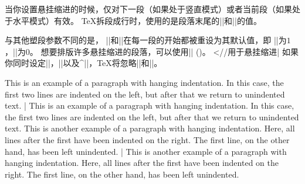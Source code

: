 当你设置悬挂缩进的时候，仅对下一段（如果处于竖直模式）或者当前段（如果处于水平模式）有效。
\TeX{}拆段成行时，使用的是段落末尾的|\hangafter|和|\hangindent|的值。
%


与其他塑段参数不同的是，
|\hangafter|和|\hangindent|在每一段的开始都被重设为其默认值，即
|\hangafter|为$1$，|\hangindent|为$0$。
想要排版许多悬挂缩进的段落，可以使用|\everypar| (\xref{\everypar})。
^^|\everypar//用于悬挂缩进|
如果你同时设定|\hangafter|，|\hangindent|以及^|\parshape|，\TeX{}将忽略|\hangafter|和|\hangindent|。

\example
\hangindent=6pc 
This is an example of a paragraph with hanging indentation.
In this case, the first two lines are indented on the left,
but after that we return to unindented text.
|
\produces
\hangindent=6pc 
This is an example of a paragraph with hanging indentation.
In this case, the first two lines are indented on the left,
but after that we return to unindented text.
\nextexample
\hangindent=-6pc 
This is another example of a paragraph with hanging
indentation.  Here, all lines after the first have been
indented on the right. The first line, on the other
hand, has been left unindented.
|
\produces
\hangindent=-6pc 
This is another example of a paragraph with hanging
indentation.  Here, all lines after the first have been
indented on the right. The first line, on the other
hand, has been left unindented.
\endexample
\enddesc

